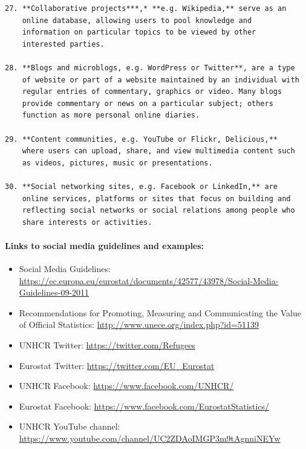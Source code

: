 \documentclass[
]{article}
\begin{document}
\begin{verbatim}
27. **Collaborative projects***,* **e.g. Wikipedia,** serve as an
    online database, allowing users to pool knowledge and
    information on particular topics to be viewed by other
    interested parties.

28. **Blogs and microblogs, e.g. WordPress or Twitter**, are a type
    of website or part of a website maintained by an individual with
    regular entries of commentary, graphics or video. Many blogs
    provide commentary or news on a particular subject; others
    function as more personal online diaries.

29. **Content communities, e.g. YouTube or Flickr, Delicious,**
    where users can upload, share, and view multimedia content such
    as videos, pictures, music or presentations.

30. **Social networking sites, e.g. Facebook or LinkedIn,** are
    online services, platforms or sites that focus on building and
    reflecting social networks or social relations among people who
    share interests or activities.
\end{verbatim}

\hypertarget{links-to-social-media-guidelines-and-examples}{%
\paragraph{Links to social media guidelines and examples:}\label{links-to-social-media-guidelines-and-examples}}

\begin{itemize}
\item
  Social Media Guidelines:\\
  \url{https://ec.europa.eu/eurostat/documents/42577/43978/Social-Media-Guidelines-09-2011}
\item
  Recommendations for Promoting, Measuring and Communicating the Value
  of Official Statistics: \url{http://www.unece.org/index.php?id=51139}
\item
  UNHCR Twitter: \url{https://twitter.com/Refugees}
\item
  Eurostat Twitter: \url{https://twitter.com/EU_Eurostat} {}
\item
  UNHCR Facebook: \url{https://www.facebook.com/UNHCR/}
\item
  Eurostat Facebook: \url{https://www.facebook.com/EurostatStatistics/}
\item
  UNHCR YouTube channel:
  \url{https://www.youtube.com/channel/UC2ZDAoIMGP3m9tAgnniNEYw}
\end{itemize}
\end{document}
